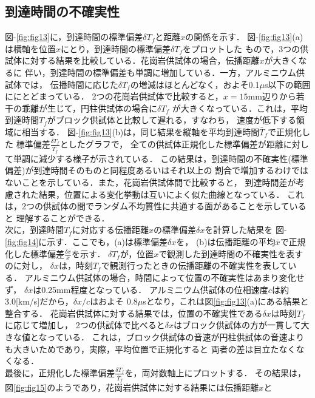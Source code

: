 \subsection{到達時間の不確実性}
図-\ref{fig:fig13}に，到達時間の標準偏差$\delta T_f$と距離$x$の関係を示す．
図-\ref{fig:fig13}(a)は横軸を位置$x$にとり，到達時間の標準偏差$\delta T_f$をプロットした
もので，3つの供試体に対する結果を比較している．花崗岩供試体の場合，伝播距離$x$が大きくなるに
伴い，到達時間の標準偏差も単調に増加している．一方，アルミニウム供試体では，
伝播時間に応じた$\delta T_f$の増減はほとんどなく，およそ0.1$\mu$s以下の範囲ににとどまっている．
2つの花崗岩供試体で比較すると，$x=15$mm辺りから若干の乖離が生じて，円柱供試体の場合に$\delta T_f$
が大きくなっている．これは，平均到達時間$T_f$がブロック供試体と比較して遅れる，すなわち，
速度が低下する領域に相当する．
図-\ref{fig:fig13}(b)は，同じ結果を縦軸を平均到達時間$\bar T_f$で正規化した
標準偏差$\frac{\delta T_f}{\bar{T}_f}$としたグラフで，
全ての供試体正規化した標準偏差が距離に対して単調に減少する様子が示されている．
この結果は，到達時間の不確実性(標準偏差)が到達時間そのものと同程度あるいはそれ以上の
割合で増加するわけではないことを示している．また，花崗岩供試体間で比較すると，
到達時間差が考慮された結果，位置による変化挙動は互いによく似た曲線となっている．
これは，2つの供試体の間でランダム不均質性に共通する面があることを示していると
理解することができる．
\\
次に，到達時間$T_f$に対応する伝播距離$x$の標準偏差$\delta x$を計算した結果を
図-\ref{fig:fig14}に示す．ここでも，(a)は標準偏差$\delta x$を，
(b)は伝播距離の平均$\bar{x}$で正規化した標準偏差$\frac{\delta x}{\bar{x}}$を示す．
$\delta T_f$が，位置$x$で観測した到達時間の不確実性を表すのに対し，
$\delta x$は，時刻$T_f$で観測行ったときの伝播距離の不確実性を表している．
アルミニウム供試体の場合，時間によって位置の不確実性はあまり変化せず，
$\delta x$は0.25mm程度となっている．
アルミニウム供試体の位相速度$c$は約3.0[km/s]だから，$\delta x/c$はおよそ
$0.8\mu$sとなり，これは図\ref{fig:fig13}(a)にある結果と整合する．
花崗岩供試体に対する結果では，位置の不確実性である$\delta x$は時刻$T_f$に応じて増加し，
2つの供試体で比べると$\delta x$はブロック供試体の方が一貫して大きな値となっている．
これは，ブロック供試体の音速が円柱供試体の音速よりも大きいためであり，実際，平均位置で正規化すると
両者の差は目立たなくなくなる．
\\
最後に，正規化した標準偏差$\frac{\delta T_f}{\bar{T}_f}$を，両対数軸上にプロットする．
その結果は，図\ref{fig:fig15}のようであり，花崗岩供試体に対する結果には伝播距離$x$と
